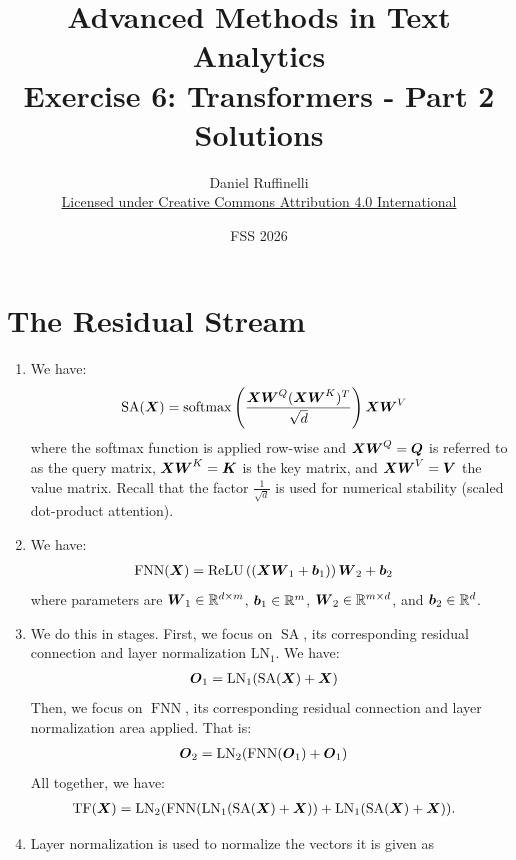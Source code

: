 \documentclass[11pt,a4paper]{article}
\title{Advanced Methods in Text Analytics \\ 
Exercise 6: Transformers - Part 2\\
\textbf{Solutions}}
\author{Daniel Ruffinelli \\ \href{https://creativecommons.org/licenses/by/4.0/}{Licensed under Creative Commons Attribution 4.0 International}}
\date{FSS 2026}
\newcommand\op[1]{\operatorname{#1}}
\begin{document}
\maketitle

\section{The Residual Stream}

\begin{enumerate}[label=(\alph*)]
    \item We have:
          \begin{align}
              \op{SA}(\mX) & = \op{softmax}\left(\frac{\mX\mW^Q(\mX\mW^K)^T}{\sqrt{d}}\right)\mX\mW^V
          \end{align}
          where the softmax function is applied row-wise and ${\boldsymbol{X}}{\boldsymbol{W}}^Q = {\boldsymbol{Q}}$ is
          referred to as the query matrix, ${\boldsymbol{X}}{\boldsymbol{W}}^K = {\boldsymbol{K}}$ is the key matrix, and
          ${\boldsymbol{X}}{\boldsymbol{W}}^V = {\boldsymbol{V}}$ the value matrix.
          Recall that the factor $\frac{1}{\sqrt{d}}$ is used for numerical
          stability (scaled dot-product attention).
    \item We have:
          \begin{align}
              \op{FNN}(\mX) & = \text{ReLU}\left((\mX\mW_1 + \vb_1)\right)\mW_2 + \vb_2
          \end{align}
          where parameters are ${\boldsymbol{W}}_1\in\mathbb{R}^{d\times m}$, ${\boldsymbol{b}}_1\in\mathbb{R}^m$,
          ${\boldsymbol{W}}_2\in\mathbb{R}^{m\times d}$, and ${\boldsymbol{b}}_2\in\mathbb{R}^d$.
    \item We do this in stages. First, we focus on $\op{SA}$, its
          corresponding residual connection and layer normalization $\op{LN_1}$.
          We have:
          \begin{align}
              \op{\mO_1} & = \op{LN_1}(\op{SA}(\mX) + \mX)
          \end{align}
          Then, we focus on $\op{FNN}$, its corresponding residual connection
          and layer normalization area applied.
          That is:
          \begin{align}
              \op{\mO_2} & = \op{LN_2}(\op{FNN}(\mO_1) + \mO_1)
          \end{align}
          All together, we have:
          \begin{align}
              \op{TF}(\mX) & = \op{LN_2}(\op{FNN}(\op{LN_1}(\op{SA}(\mX) + \mX)) + \op{LN_1}(\op{SA}(\mX) + \mX)).
          \end{align}
    \item Layer normalization is used to normalize the vectors it is given as

\end{enumerate}
\end{document}
